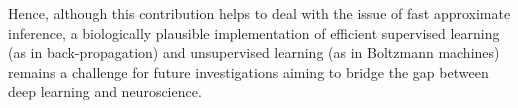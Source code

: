 \documentclass{article}
\newif\iffinal
\begin{document}
Hence, although this contribution helps to deal with the issue of fast
approximate inference, a biologically plausible implementation of efficient supervised
learning (as in back-propagation) and unsupervised learning (as in Boltzmann machines) remains
a challenge for future investigations aiming to bridge the gap between deep learning
and neuroscience.

\iffinal
\section*{Acknowledgments}

The authors would like to thank Tong Che, Vincent Dumoulin, Kumar Krishna Agarwal
for feedback and discussions, as well as NSERC, CIFAR, Samsung and
Canada Research Chairs for funding.%
\fi



%


\end{document}
